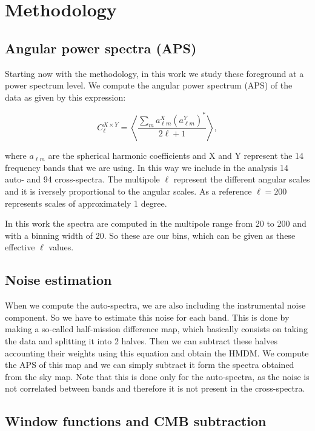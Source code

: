 \documentclass[12pt,a4paper]{article}
\begin{document}
\section{Methodology}

\subsection{Angular power spectra (APS)}

Starting now with the methodology, in this work we study these foreground at a power spectrum level. We compute the angular power spectrum (APS) of the data as given by this expression: 

\begin{equation}
    \label{eq:cl_cross}
    C_{\ell}^{X \times Y} = \left\langle \frac{\sum_{m} a_{\ell m}^{X} (a_{\ell m}^{Y})^{*}}{2\ell + 1} \right\rangle,
\end{equation}

where $a_{\ell m}$ are the spherical harmonic coefficients and X and Y represent the 14 frequency bands that we are using. In this way we include in the analysis 14 auto- and 94 cross-spectra. The multipole $\ell$ represent the different angular scales and it is iversely proportional to the angular scales. As a reference $\ell = 200$ represents scales of approximately 1 degree. 

In this work the spectra are computed in the multipole range from 20 to 200 and with a binning width of 20. So these are our bins, which can be given as these effective $\ell$ values.


\subsection{Noise estimation}


When we compute the auto-spectra, we are also including the instrumental noise component. So we have to estimate this noise for each band. This is done by making a so-called half-mission difference map, which basically consists on taking the data and splitting it into 2 halves. Then we can subtract these halves accounting their weights using this equation and obtain the HMDM. We compute the APS of this map and we can simply subtract it form the spectra obtained from the sky map. Note that this is done only for the auto-spectra, as the noise is not correlated between bands and therefore it is not present in the cross-spectra.

\subsection{Window functions and CMB subtraction}
\end{document}
